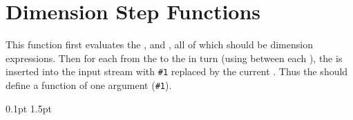 \documentclass[oneside]{book}
\begin{document}
\section{Dimension Step Functions}


\begin{function}{\DimStepInline}
\begin{syntax}
    
\end{syntax}
This function first evaluates the , 
and , all of which should be dimension expressions.
Then for each  from the  to the
 in turn (using  between each
), the  is inserted into the input stream
with \verb|#1| replaced by the current .  Thus the
 should define a function of one argument (\verb|#1|).
\begin{demohigh}
\IgnoreSpacesOn
\TlClear \lTmpaTl
\DimStepInline {1pt} {0.1pt} {1.5pt} {
  \TlPutRight \lTmpaTl {[#1]}
}
\TlUse \lTmpaTl
\IgnoreSpacesOff
\end{demohigh}
\end{function}
\end{document}
